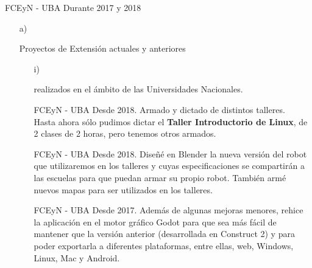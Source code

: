 \begin{itemize}[leftmargin=0.5cm]
{FCEyN - UBA}
{Durante 2017 y 2018}{}
\end{itemize}

\begin{enumerate}[leftmargin=0.8cm]

  \item[a)]{Proyectos de Extensión actuales y anteriores

    \begin{itemize}[leftmargin=0.2cm]

      \item[i)]{realizados en el ámbito de las Universidades Nacionales.

        \begin{itemize}[leftmargin=0.2cm]

          {FCEyN - UBA}
          {Desde 2018.}
          {Armado y dictado de distintos talleres. \\
          Hasta ahora sólo pudimos dictar el \textbf{Taller Introductorio de Linux}, de 2 clases de 2 horas, pero tenemos otros armados.}

          {FCEyN - UBA}
          {Desde 2018.}
          {Diseñé en Blender la nueva versión del robot que utilizaremos en los talleres y cuyas
            especificaciones se compartirán a las escuelas para que puedan armar su propio robot.
            También armé nuevos mapas para ser utilizados en los talleres.}

          {FCEyN - UBA}
          {Desde 2017.}
          {Además de algunas mejoras menores, rehice la aplicación en el motor gráfico Godot para
            que sea más fácil de mantener que la versión anterior (desarrollada en Construct 2) y
            para poder exportarla a diferentes plataformas, entre ellas, web, Windows, Linux, Mac y Android.}


\end{itemize}}
\end{itemize}}
\end{enumerate}
